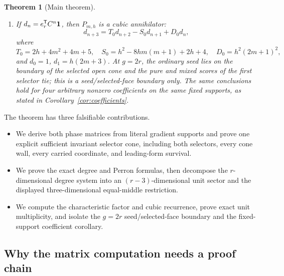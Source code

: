 \documentclass[11pt]{article}
\newtheorem{theorem}{Theorem}[section]
\theoremstyle{remark}
\numberwithin{equation}{section}
\begin{document}
\begin{theorem}[Main theorem]
\begin{enumerate}[label=\textup{(\roman*)}]
\[\begin{pmatrix}
2h+4m+2 & 4m^2+1 & 4m\\
2h & 2mh & h
\end{pmatrix}
\]
represents \(C|_E\), and
\begin{equation}\label{eq:main-factor}
\chi_C(t)=(t-1)^{r-3}P_{m,h}(t),
\end{equation}
where
\begin{equation}\label{eq:main-cubic}
\begin{aligned}
P_{m,h}(t)
={}&t^3-(2h+4m^2+4m+5)t^2\\
&+(h^2-8hm(m+1)+2h+4)t\\
&-h^2(2m+1)^2.
\end{aligned}
\end{equation}
Moreover,
\[
P_{m,h}(1)=-4m(m+1)(h+1)^2\neq0,
\]
so the eigenvalue \(1\) has algebraic and geometric multiplicity exactly
\(r-3\).
\item If \(d_n=e_r^{\mathsf{T}}C^n\mathbf{1}\), then \(P_{m,h}\) is a cubic
annihilator:
\[
d_{n+3}=T_0d_{n+2}-S_0d_{n+1}+D_0d_n,
\]
where
\[
T_0=2h+4m^2+4m+5,\quad
S_0=h^2-8hm(m+1)+2h+4,\quad
D_0=h^2(2m+1)^2,
\]
and \(d_0=1\), \(d_1=h(2m+3)\).  At \(g=2r\), the ordinary seed lies on
the boundary of the selected open cone and the pure and mixed scores of the
first selector tie; this is a seed/selected-face boundary only.  The same
conclusions hold for four arbitrary nonzero coefficients on the same fixed
supports, as stated in Corollary~\ref{cor:coefficients}.
\end{enumerate}
\end{theorem}

The theorem has three falsifiable contributions.
\begin{itemize}
\item We derive both phase matrices from literal gradient supports and prove
one explicit sufficient invariant selector cone, including both selectors,
every cone wall, every carried coordinate, and leading-form survival.
\item We prove the exact degree and Perron formulas, then decompose the
\(r\)-dimensional degree system into an \((r-3)\)-dimensional unit sector
and the displayed three-dimensional equal-middle restriction.
\item We compute the characteristic factor and cubic recurrence, prove exact
unit multiplicity, and isolate the \(g=2r\) seed/selected-face boundary and
the fixed-support coefficient corollary.
\end{itemize}

\subsection*{Why the matrix computation needs a proof chain}
\end{document}

